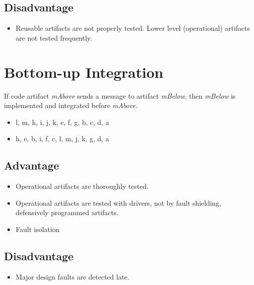 \documentclass[11pt]{article}
\begin{document}
\subsection*{Disadvantage}

\begin{itemize}
	\item 
	
	Reusable artifacts are not properly tested. Lower level (operational) artifacts are not tested frequently.
	
\end{itemize}

\section*{Bottom-up Integration}

If code artifact \textit{mAbove} sends a message to artifact \textit{mBelow}, then \textit{mBelow} is implemented and integrated before \textit{mAbove}.

\begin{itemize}
	\item l, m, h, i, j, k, e, f, g, b, c, d, a
	\item h, e, b, i, f, c, l, m, j, k, g, d, a
\end{itemize}


\subsection*{Advantage}

\begin{itemize}
	\item
	
	Operational artifacts are thoroughly tested.

	\item 
	
	Operational artifacts are tested with drivers, not by fault shielding, defensively programmed artifacts.

	\item
	
	Fault isolation
	
\end{itemize}

\subsection*{Disadvantage}

\begin{itemize}
	\item 
	
	Major design faults are detected late.
	
\end{itemize}
\end{document}
